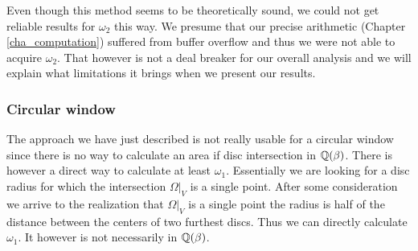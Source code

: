 \documentclass[text.tex]{subfiles}
\begin{document}
Even though this method seems to be theoretically sound, we could not get reliable results for $\omega_2$ this way. We presume that our precise arithmetic (Chapter \ref{cha_computation}) suffered from buffer overflow and thus we were not able to acquire $\omega_2$. That however is not a deal breaker for our overall analysis and we will explain what limitations it brings when we present our results. 

\subsubsection{Circular window}
The approach we have just described is not really usable for a circular window since there is no way to calculate an area if disc intersection in $\mathbb{Q}(\beta)$. There is however a direct way to calculate at least $\omega_1$. Essentially we are looking for a disc radius for which the intersection $\Omega|_V$ is a single point. After some consideration we arrive to the realization that $\Omega|_V$ is a single point the radius is half of the distance between the centers of two furthest discs. Thus we can directly calculate $\omega_1$. It however is not necessarily in $\mathbb{Q}(\beta)$. 
\end{document}
